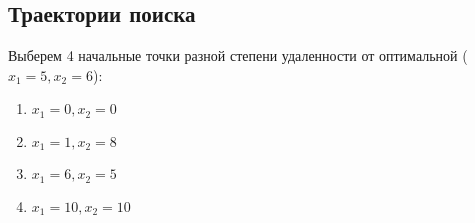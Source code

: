 \subsection{Траектории поиска}

Выберем 4 начальные точки разной степени удаленности от оптимальной ($x_1 = 5, x_2 = 6$): 
\begin{multicols}{2} 
\begin{enumerate}
	\setlength{\itemsep}{0em}
	\item $x_1 = 0, x_2 = 0$
	\item $x_1 = 1, x_2 = 8$
	\item $x_1 = 6, x_2 = 5$
	\item $x_1 = 10, x_2 = 10$
\end{enumerate}
\end{multicols}

